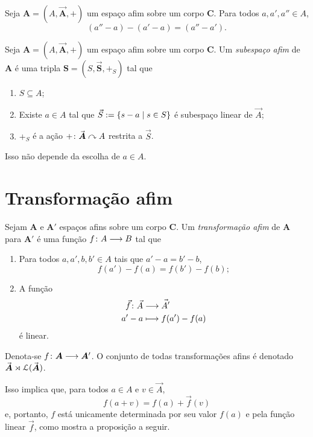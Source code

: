 \begin{exercise}
Seja $\bm A = (A,\vec{\bm A},+)$ um espaço afim sobre um corpo $\bm C$. Para todos $a,a',a'' \in A$,
	\begin{equation*}
		(a''-a) - (a'-a) = (a''-a').
	\end{equation*}
\end{exercise}


\begin{definition}
Seja $\bm A = (A,\vec{\bm A},+)$ um espaço afim sobre um corpo $\bm C$. Um \emph{subespaço afim} de $\bm A$ é uma tripla $\bm S = (S,\vec{\bm S},+_S)$ tal que
	\begin{enumerate}
		\item $S \subseteq A$;
		\item Existe $a \in A$ tal que $\vec{S} := \left\{{s-a}\;\middle\vert\;{s \in S}\right\}$ é subespaço linear de $\vec{A}$;
		\item $+_S$ é a ação $+\colon \vec{\bm A} \curvearrowright A$ restrita a $\vec{S}$.
	\end{enumerate}
\end{definition}

Isso não depende da escolha de $a \in A$.


\section{Transformação afim}

\begin{definition}
Sejam $\bm A$ e $\bm A'$ espaços afins sobre um corpo $\bm C$. Um \emph{transformação afim} de $\bm A$ para $\bm A'$ é uma função ${f}\colon {A} \longrightarrow {B}$ tal que
	\begin{enumerate}
		\item Para todos $a,a',b,b' \in A$ tais que $a'-a = b'-b$,
			\begin{equation*}
				f(a')-f(a) = f(b')-f(b);
			\end{equation*}
		\item A função
			\begin{align*}
				{\vec{f}}\colon {\vec{A}} &\longrightarrow {\vec{A'}} \\{a'-a} &\longmapsto f(a')-f(a)
			\end{align*}
		é linear.
	\end{enumerate}
Denota-se ${f}\colon {\bm A} \longrightarrow {\bm A'}$. O conjunto de todas transformações afins é denotado $\vec{\bm A} \rtimes \mathcal{L}(\vec{\bm A})$.
\end{definition}

Isso implica que, para todos $a \in A$ e $v \in \vec{A}$,
	\begin{equation*}
		f(a+v) = f(a) + \vec{f}(v)
	\end{equation*}
e, portanto, $f$ está unicamente determinada por seu valor $f(a)$ e pela função linear $\vec{f}$, como mostra a proposição a seguir.

